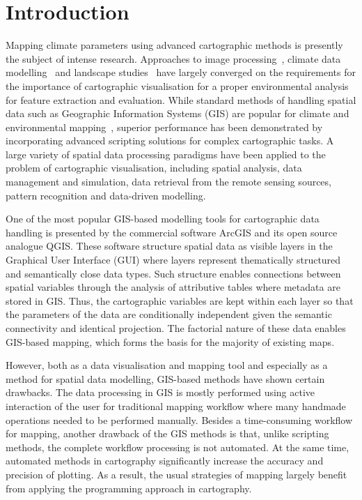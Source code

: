 \documentclass[ijgi,article,accept,pdftex,moreauthors]{Definitions/mdpi}
\begin{document}
\section{Introduction}

Mapping climate parameters using advanced cartographic methods is presently the subject of intense research. Approaches to image processing~\cite{Turner,Hamandawana}, climate data modelling~\cite{MaoyiAbiodun} and landscape studies~\cite{Segobye} have largely converged on the requirements for the importance of cartographic visualisation for a proper environmental analysis for feature extraction and evaluation. While standard methods of handling spatial data such as Geographic Information Systems (GIS) are popular for climate and environmental mapping~\cite{Ceccato,Sherbinin,Herslund}, superior performance has been demonstrated by incorporating advanced scripting solutions for complex cartographic tasks. A large variety of spatial data processing paradigms have been applied to the problem of cartographic visualisation, including spatial analysis, data management and simulation, data retrieval from the remote sensing sources, pattern recognition and data-driven modelling.

One of the most popular GIS-based modelling tools for cartographic data handling is presented by the commercial software ArcGIS and its open source analogue QGIS. These software structure spatial data as visible layers in the Graphical User Interface (GUI) where layers represent thematically structured and semantically close data types. Such structure enables connections between spatial variables through the analysis of attributive tables where metadata are stored in GIS. Thus, the cartographic variables are kept within each layer so that the parameters of the data are conditionally independent given the semantic connectivity and identical projection. The factorial nature of these data enables GIS-based mapping, which forms the basis for the majority of existing maps. 

However, both as a data visualisation and mapping tool and especially as a method for spatial data modelling, GIS-based methods have shown certain drawbacks. The data processing in GIS is mostly performed using active interaction of the user for traditional mapping workflow where many handmade operations needed to be performed manually. Besides a time-consuming workflow for mapping, another drawback of the GIS methods is that, unlike scripting methods, the complete workflow processing is not automated. At the same time, automated methods in cartography significantly increase the accuracy and precision of plotting. As a result, the usual strategies of mapping largely benefit from applying the programming approach in cartography.
\end{document}
